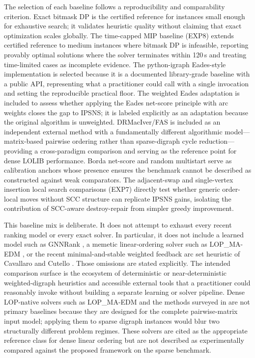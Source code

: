 The selection of each baseline follows a reproducibility and comparability criterion. Exact bitmask DP is the certified reference for instances small enough for exhaustive search; it validates heuristic quality without claiming that exact optimization scales globally. The time-capped MIP baseline (EXP8) extends certified reference to medium instances where bitmask DP is infeasible, reporting provably optimal solutions where the solver terminates within 120\,s and treating time-limited cases as incomplete evidence. The python-igraph Eades-style implementation is selected because it is a documented library-grade baseline with a public API, representing what a practitioner could call with a single invocation and setting the reproducible practical floor. The weighted Eades adaptation is included to assess whether applying the Eades net-score principle with arc weights closes the gap to IPSNS; it is labeled explicitly as an adaptation because the original \cite{ELS93} algorithm is unweighted. DRMacIver/FAS is included as an independent external method with a fundamentally different algorithmic model---matrix-based pairwise ordering rather than sparse-digraph cycle reduction---providing a cross-paradigm comparison and serving as the reference point for dense LOLIB performance. Borda net-score and random multistart serve as calibration anchors whose presence ensures the benchmark cannot be described as constructed against weak comparators. The adjacent-swap and single-vertex insertion local search comparisons (EXP7) directly test whether generic order-local moves without SCC structure can replicate IPSNS gains, isolating the contribution of SCC-aware destroy-repair from simpler greedy improvement.

This baseline mix is deliberate. It does not attempt to exhaust every recent ranking model or every exact solver. In particular, it does not include a learned model such as GNNRank \cite{GNNRank22}, a memetic linear-ordering solver such as LOP\_MA-EDM \cite{lop_ma_edm_repo}, or the recent minimal-and-stable weighted feedback arc set heuristic of Cavallaro and Cutello \cite{CC25}. Those omissions are stated explicitly. The intended comparison surface is the ecosystem of deterministic or near-deterministic weighted-digraph heuristics and accessible external tools that a practitioner could reasonably invoke without building a separate learning or solver pipeline. Dense LOP-native solvers such as LOP\_MA-EDM and the methods surveyed in \cite{MRD12} are not primary baselines because they are designed for the complete pairwise-matrix input model; applying them to sparse digraph instances would blur two structurally different problem regimes. These solvers are cited as the appropriate reference class for dense linear ordering but are not described as experimentally compared against the proposed framework on the sparse benchmark.

